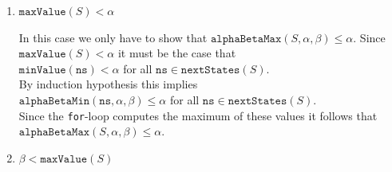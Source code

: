\begin{enumerate}
\begin{enumerate}[(a)]
\begin{enumerate}
              \\[0.2cm]
              As we already know that $\texttt{minValue}(\texttt{ns}) < \beta$, the induction hypothesis tells us that 
              \\[0.2cm]
              \hspace*{1.3cm}
              $\texttt{alphaBetaMin}(\mathtt{ns}, \alpha, \beta) = \texttt{minValue}(\mathtt{ns})$
              \\[0.2cm]
              Hence the value computed in the \texttt{for}-loop is equal to
              $\mathtt{alphaBetaMin}(\mathtt{ns}, \alpha, \beta)$ and therefore we have
              \\[0.2cm]
              \hspace*{0.3cm}
              $\mathtt{alphaBetaMax}(S, \alpha, \beta) = \mathtt{alphaBetaMin}(\mathtt{ns}, \alpha, \beta)
              = \mathtt{minValue}(\mathtt{ns}) = \mathtt{maxValue}(S)$.
        \end{enumerate}
  \end{enumerate}
\item $\texttt{maxValue}(S) < \alpha$

  In this case we only have to show that $\mathtt{alphaBetaMax}(S, \alpha, \beta) \leq \alpha$.
  Since $\texttt{maxValue}(S) < \alpha$ it must be the case that
  \\[0.2cm]
  \hspace*{1.3cm}
  $\mathtt{minValue}(\mathtt{ns}) < \alpha$ \quad for all $\mathtt{ns} \in \mathtt{nextStates}(S)$.
  \\[0.2cm]
  By induction hypothesis this implies
  \\[0.2cm]
  \hspace*{1.3cm}
  $\mathtt{alphaBetaMin}(\mathtt{ns}, \alpha, \beta) \leq \alpha$ \quad for all $\mathtt{ns} \in \mathtt{nextStates}(S)$.
  \\[0.2cm]
  Since the \texttt{for}-loop computes the maximum of these values it follows that
  \\[0.2cm]
  \hspace*{1.3cm}
  $\mathtt{alphaBetaMax}(S, \alpha, \beta) \leq \alpha$. 
\item $\beta < \texttt{maxValue}(S)$


\end{enumerate}

